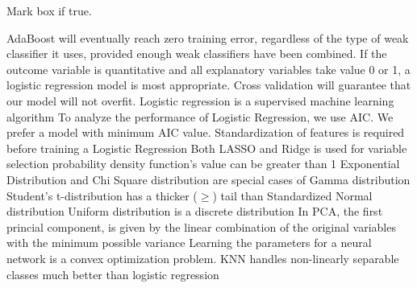 \documentclass[12pt]{exam}
\begin{document}
\begin{questions}
\question[12] Mark box if true.
\addpoints
\begin{checkboxes}
\choice AdaBoost will eventually reach zero training error, regardless of the type of weak classifier it uses, provided enough weak classifiers have been combined. %
\choice If the outcome variable is quantitative and all explanatory variables take value 0 or 1, a logistic regression model is most appropriate. %
\choice Cross validation will guarantee that our model will not overfit. %
\choice Logistic regression is a supervised machine learning algorithm %
\choice To analyze the performance of Logistic Regression, we use AIC. We prefer a model with minimum AIC value. %
\choice Standardization of features is required before training a Logistic Regression %
\choice Both LASSO and Ridge is used for variable selection %
\choice probability density function's value can be greater than 1
\choice Exponential Distribution and Chi Square distribution are special cases of Gamma distribution
\choice Student's t-distribution has a thicker ($\geq$) tail than Standardized Normal distribution
\choice Uniform distribution is a discrete distribution
\choice In PCA, the first princial component, is given by the linear combination of the original variables with the minimum possible variance
\choice Learning the parameters for a neural network is a convex optimization problem. %
\choice KNN handles non-linearly separable classes much better than logistic regression %
\end{checkboxes}




\end{questions}
\end{document}
